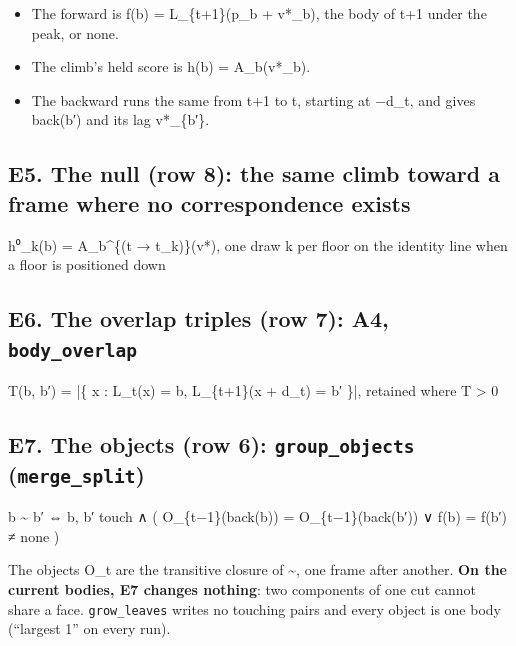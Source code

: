 \begin{itemize}
\item The forward is f(b) = L\_\allowbreak{}\{t+1\}(p\_\allowbreak{}b + v*\_\allowbreak{}b), the body of t+1 under the peak, or none.
\item The climb's held score is h(b) = A\_\allowbreak{}b(v*\_\allowbreak{}b).
\item The backward runs the same from t+1 to t, starting at −d\_\allowbreak{}t, and gives back(b′) and its lag v*\_\allowbreak{}\{b′\}.
\end{itemize}

\subsection{\texorpdfstring{E5. The null (row 8): the same climb toward a frame where no correspondence exists}{E5. The null (row 8): the same climb toward a frame where no correspondence exists}}

h⁰\_\allowbreak{}k(b) = A\_\allowbreak{}b\textasciicircum{}\{(t → t\_\allowbreak{}k)\}(v*),  one draw k per floor on the identity line when a floor is positioned down

\subsection{\texorpdfstring{E6. The overlap triples (row 7): A4, \texttt{body\_\allowbreak{}overlap}}{E6. The overlap triples (row 7): A4, body\_overlap}}

T(b, b′) = |\{ x : L\_\allowbreak{}t(x) = b, L\_\allowbreak{}\{t+1\}(x + d\_\allowbreak{}t) = b′ \}|,  retained where T > 0

\subsection{\texorpdfstring{E7. The objects (row 6): \texttt{group\_\allowbreak{}objects} (\texttt{merge\_\allowbreak{}split})}{E7. The objects (row 6): group\_objects (merge\_split)}}

b \textasciitilde{} b′ ⇔ b, b′ touch ∧ ( O\_\allowbreak{}\{t−1\}(back(b)) = O\_\allowbreak{}\{t−1\}(back(b′)) ∨ f(b) = f(b′) ≠ none )

The objects O\_\allowbreak{}t are the transitive closure of \textasciitilde{}, one frame after another. \textbf{On the current bodies, E7 changes nothing}: two components of one cut cannot share a face. \texttt{grow\_\allowbreak{}leaves} writes no touching pairs and every object is one body (“largest 1” on every run).

